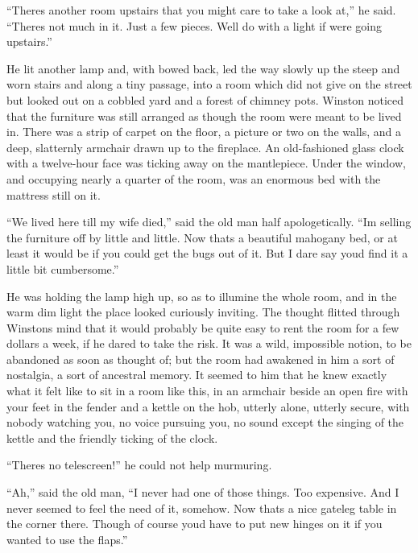 ``There\textquotesingle s another room upstairs that you might care to
take a look at,'' he said. ``There\textquotesingle s not much in it. Just
a few pieces. We\textquotesingle ll do with a light if
we\textquotesingle re going upstairs.''

He lit another lamp and, with bowed back, led the way slowly up the
steep and worn stairs and along a tiny passage, into a room which did
not give on the street but looked out on a cobbled yard and a forest of
chimney pots. Winston noticed that the furniture was still arranged as
though the room were meant to be lived in. There was a strip of carpet
on the floor, a picture or two on the walls, and a deep, slatternly
armchair drawn up to the fireplace. An old-fashioned glass clock with a
twelve-hour face was ticking away on the mantlepiece. Under the window,
and occupying nearly a quarter of the room, was an enormous bed with the
mattress still on it.

``We lived here till my wife died,'' said the old man half apologetically.
``I\textquotesingle m selling the furniture off by little and little. Now
that\textquotesingle s a beautiful mahogany bed, or at least it would be
if you could get the bugs out of it. But I dare say
you\textquotesingle d find it a little bit cumbersome.''

He was holding the lamp high up, so as to illumine the whole room, and
in the warm dim light the place looked curiously inviting. The thought
flitted through Winston\textquotesingle s mind that it would probably be
quite easy to rent the room for a few dollars a week, if he dared to
take the risk. It was a wild, impossible notion, to be abandoned as soon
as thought of; but the room had awakened in him a sort of nostalgia, a
sort of ancestral memory. It seemed to him that he knew exactly what it
felt like to sit in a room like this, in an armchair beside an open fire
with your feet in the fender and a kettle on the hob, utterly alone,
utterly secure, with nobody watching you, no voice pursuing you, no
sound except the singing of the kettle and the friendly ticking of the
clock.

``There\textquotesingle s no telescreen!'' he could not help murmuring.

``Ah,'' said the old man, ``I never had one of those things. Too expensive.
And I never seemed to feel the need of it, somehow. Now
that\textquotesingle s a nice gateleg table in the corner there. Though
of course you\textquotesingle d have to put new hinges on it if you
wanted to use the flaps.''

